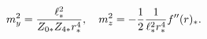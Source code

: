 \begin{equation}
m^{2}_{y}={\ell^{2}_{*}\over Z_{0*}Z_{4*}r^{4}_{*}},
\quad
m^{2}_{z}=-{1\over 2}{1\over \ell^{2}_{*}r^{4}_{*}}f''(r)_{*}.
\label{eq:masses}
\end{equation}

